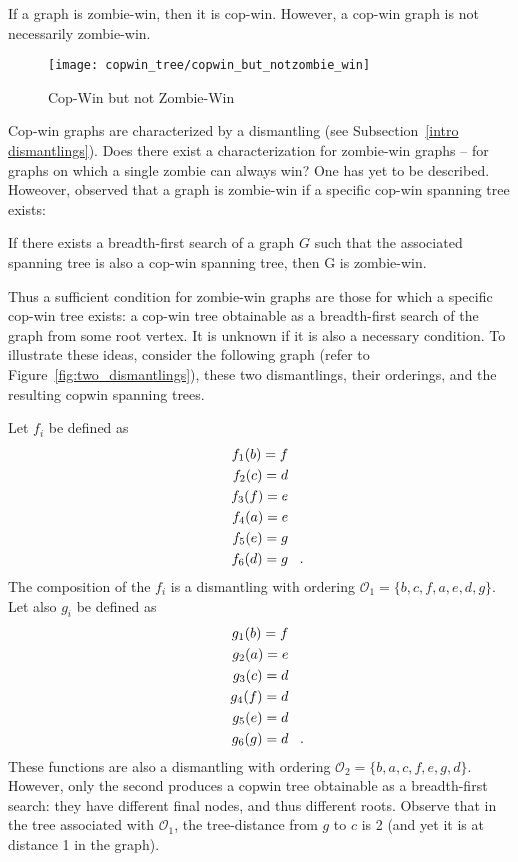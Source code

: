\begin{theorem}
If a graph is zombie-win, then it is cop-win. However, a cop-win graph is not necessarily zombie-win.
\end{theorem}

\begin{figure}
\centering
\texttt{[image: copwin\_tree/copwin\_but\_notzombie\_win]}
\caption{Cop-Win but not Zombie-Win \label{fig:copwin_but_notzombie_win}}
\end{figure}

Cop-win graphs are characterized by a dismantling (see Subsection~\ref{intro dismantlings}). Does there exist a characterization for zombie-win graphs -- for graphs on which a single zombie can always win? One has yet to be described. Howeover, \cite{fitzpatrick2016deterministic} observed that a graph is zombie-win if a specific cop-win spanning tree exists:

\begin{theorem} If there exists a breadth-first search of a graph $G$ such that the associated spanning tree is also a cop-win spanning tree, then G is zombie-win. \label{thm:zombie_tree}
\end{theorem}

Thus a sufficient condition for zombie-win graphs are those for which a specific cop-win tree exists: a cop-win tree obtainable as a breadth-first search of the graph from some root vertex. It is unknown if it is also a necessary condition. To illustrate these ideas, consider the following graph (refer to Figure~\ref{fig:two_dismantlings}), these two dismantlings, their orderings, and the resulting copwin spanning trees.

Let $f_i$ be defined as
\begin{align*}
  f_1(b) = f \\
  f_2(c) = d \\
  f_3(f) = e \\
  f_4(a) = e \\
  f_5(e) = g \\
  f_6(d) = g \mperiod
\end{align*}
The composition of the $f_i$ is a dismantling with ordering $\mathcal{O}_1 = \{ b, c, f, a, e, d, g \}$.
Let also $g_i$ be defined as
\begin{align*}
  g_1(b) = f \\
  g_2(a) = e \\
  g_3(c) = d \\
  g_4(f) = d \\
  g_5(e) = d \\
  g_6(g) = d \mperiod
\end{align*}
These functions are also a dismantling with ordering $\mathcal{O}_2 = \{b, a, c, f, e, g, d \}$.
However, only the second produces a copwin tree obtainable as a breadth-first search: they have different final nodes, and thus different roots. Observe that in the tree associated with $\mathcal{O}_1$, the tree-distance from $g$ to $c$ is 2 (and yet it is at distance 1 in the graph).

